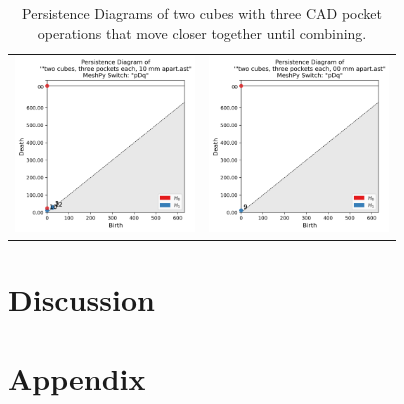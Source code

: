 \documentclass[ma]{uncgdissertationexp}
\theoremstyle{plain}
\theoremstyle{definition}
\theoremstyle{remark}
\begin{document}
\begin{table}[H]
\begin{center}
\begin{tabular}{cc}
         \includegraphics[width=1.875in]{Final Run, (two cubes, three pockets each, 10 mm apart) persdia.png} & 
         \includegraphics[width=1.875in]{Final Run, (two cubes, three pockets each, 00 mm apart) persdia.png} \\
\end{tabular}
\end{center}
    \caption{Persistence Diagrams of two cubes with three CAD pocket operations that move closer together until combining.}
    \label{fig:cube_two_cubes_persdia_table}
\end{table}

\chapter{Discussion}






\appendix
\chapter{Appendix}

\backmatter
\end{document}
